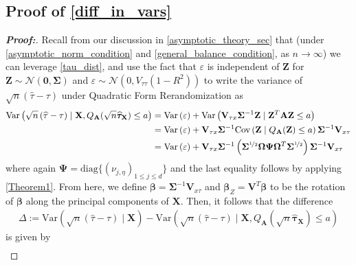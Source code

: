 \documentclass[11pt,twoside]{article}
\theoremstyle{definition}
\theoremstyle{remark}
\begin{document}
\subsection{Proof of \texorpdfstring{\cref{diff_in_vars}}{Theorem 4}} \label{diff_in_vars_proof}
\begin{proof}[\textbf{Proof:}]
Recall from our discussion in \cref{asymptotic_theory_sec} that (under \cref{asymptotic_norm_condition} and \cref{general_balance_condition}, as $n \to \infty$) we can leverage \cref{tau_dist}, and use the fact that $\varepsilon$ is independent of $\mathbf{Z}$ for $\mathbf{Z} \sim \mathcal{N}(\mathbf{0}, \mathbf{\Sigma})$ and $\varepsilon \sim \mathcal{N}(0, V_{\tau \tau}(1 - R^2))$ to write the variance of $\sqrt{n} \left(\widehat{\tau} - \tau \right)$ under Quadratic Form Rerandomization as
\begin{align*}
    \text{Var}\left(  \sqrt{n} \left(\widehat{\tau} - \tau \right) \mid \mathbf{X}, Q_{\mathbf{A}}(\sqrt{n} \widehat{\bm{\tau}}_{\mathbf{X}}) \leq a \right) &= \text{Var}\left(\varepsilon\right) + \text{Var}\left(\mathbf{V}_{\tau x} \mathbf{\Sigma}^{-1} \mathbf{Z} \mid  \mathbf{Z}^T \mathbf{A} \mathbf{Z} \leq a \right) \\
    &= \text{Var}\left(\varepsilon \right) + \mathbf{V}_{\tau x} \mathbf{\Sigma}^{-1} \text{Cov}\left( \mathbf{Z} \mid Q_{\mathbf{A}}(\mathbf{Z}) \leq a \right) \mathbf{\Sigma}^{-1} \mathbf{V}_{x \tau } \\
    &= \text{Var}\left(\varepsilon\right) + \mathbf{V}_{\tau x} \mathbf{\Sigma}^{-1} \left(\mathbf{\Sigma}^{\nicefrac{1}{2}} \mathbf{\Omega} \mathbf{\Psi} \mathbf{\Omega}^T \mathbf{\Sigma}^{\nicefrac{1}{2}} \right) \mathbf{\Sigma}^{-1} \mathbf{V}_{x \tau }
\end{align*}
where again $\mathbf{\Psi} = \text{diag}\{(\nu_{j, \eta})_{1 \leq j \leq d} \}$ and the last equality follows by applying \cref{Theorem1}. From here, we define $\bm{\beta} = \mathbf{\Sigma}^{-1} \mathbf{V}_{x \tau }$ and $\bm{\beta}_Z = \mathbf{V}^T \bm{\beta}$ to be the rotation of $\bm{\beta}$ along the principal components of $\mathbf{X}$. Then, it follows that the difference
\begin{align*}
    \Delta := \text{Var}\left(  \sqrt{n} \left(\widehat{\tau} - \tau \right) \mid \mathbf{X} \right) - \text{Var}\left(  \sqrt{n} \left(\widehat{\tau} - \tau \right) \mid \mathbf{X}, Q_{\mathbf{A}}(\sqrt{n} \widehat{\bm{\tau}}_{\mathbf{X}}) \leq a \right)
\end{align*}
is given by
\begin{align*}

\end{align*}
\end{proof}
\end{document}
